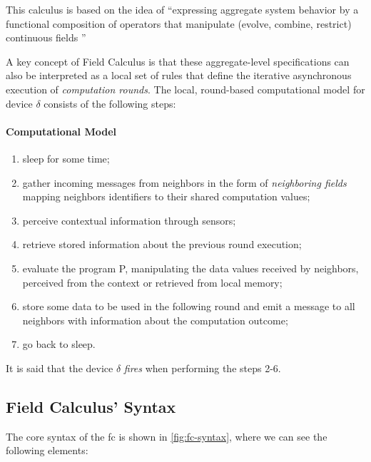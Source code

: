 This calculus is based on the idea of ``expressing aggregate system behavior by a functional composition of operators that manipulate (evolve, combine, restrict) continuous fields \cite{10.1007/978-3-642-45364-9_11}''

A key concept of Field Calculus is that these aggregate-level specifications can also be interpreted as a local set of rules that define the iterative asynchronous execution of \textit{computation rounds}.
The local, round-based computational model for device $\delta$ consists of the following steps:

\paragraph{Computational Model}
\label{par:comp-model}
\begin{enumerate}
    \item sleep for some time;
    \item gather incoming messages from neighbors in the form of \textit{neighboring fields} mapping neighbors identifiers to their shared computation values;
    \item perceive contextual information through sensors;
    \item retrieve stored information about the previous round execution;
    \item evaluate the program P, manipulating the data values received by neighbors, perceived from the context or retrieved from local memory;
    \item store some data to be used in the following round and emit a message to all neighbors with information about the computation outcome;
    \item go back to sleep.
\end{enumerate}

It is said that the device $\delta$ \textit{fires} when performing the steps 2-6.

\subsection{Field Calculus' Syntax}
\label{subsec:fc-syntax}
The core syntax of the \ac{fc} is shown in \cref{fig:fc-syntax}, where we can see the following elements:

